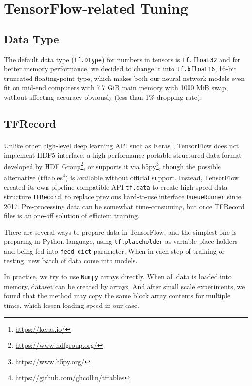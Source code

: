\section{TensorFlow-related Tuning}
\subsection{Data Type}
The default data type (\texttt{tf.DType}) for numbers in tensors is \texttt{tf.float32} and for better memory performance, we decided to change it into \texttt{tf.bfloat16}, 16-bit truncated floating-point type, which makes both our neural network models even fit on mid-end computers with 7.7 GiB main memory with 1000 MiB swap, without affecting accuracy obviously (less than 1\% dropping rate).

\subsection{TFRecord}
Unlike other high-level deep learning API such as Keras\footnote{\url{https://keras.io/}}, TensorFlow does not implement HDF5 interface, a high-performance portable structured data format developed by HDF Group\footnote{\url{https://www.hdfgroup.org/}}, or supports it via h5py\footnote{\url{https://www.h5py.org/}}, though the possible alternative (tftables\footnote{\url{https://github.com/ghcollin/tftables}}) is available without official support. Instead, TensorFlow created its own pipeline-compatible API \texttt{tf.data} to create high-speed data structure \texttt{TFRecord}, to replace previous hard-to-use interface \texttt{QueueRunner}\cite[pp.~338]{geron2017hands} since 2017. Pre-processing data can be somewhat time-consuming, but once TFRecord files is an one-off solution of efficient training.

There are several ways to prepare data in TensorFlow, and the simplest one is preparing in Python language, using \texttt{tf.placeholder} as variable place holders and being fed into \texttt{feed\_dict} parameter. When in each step of training or testing, new batch of data come into models.

In practice, we try to use \texttt{Numpy} arrays directly. When all data is loaded into memory, dataset can be created by arrays. And after small scale experiments, we found that the method may copy the same block array contents for multiple times, which lessen loading speed in our case.

